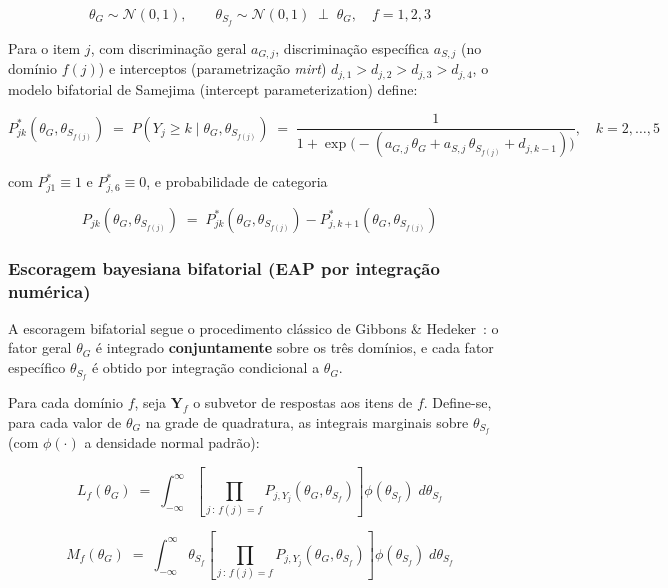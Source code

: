 \documentclass[12pt,a4paper]{article}
\begin{document}
\begin{equation}
\theta_G \sim \mathcal{N}(0,1), \qquad
\theta_{S_f} \sim \mathcal{N}(0,1) \; \perp \; \theta_G, \quad f=1,2,3
\label{eq:iqol-prior}
\end{equation}

Para o item $j$, com discriminação geral $a_{G,j}$, discriminação específica
$a_{S,j}$ (no domínio $f(j)$) e interceptos (parametrização \emph{mirt})
$d_{j,1} > d_{j,2} > d_{j,3} > d_{j,4}$, o modelo bifatorial de Samejima
(intercept parameterization) define:

\begin{equation}
P^*_{jk}(\theta_G, \theta_{S_{f(j)}}) \;=\; P(Y_j \geq k \mid \theta_G,\theta_{S_{f(j)}})
\;=\; \frac{1}{1 + \exp\!\big(-(a_{G,j}\,\theta_G + a_{S,j}\,\theta_{S_{f(j)}} + d_{j,k-1})\big)},
\quad k=2,\dots,5
\label{eq:iqol-cumulative}
\end{equation}

com $P^*_{j1} \equiv 1$ e $P^*_{j,6} \equiv 0$, e probabilidade de categoria

\begin{equation}
P_{jk}(\theta_G, \theta_{S_{f(j)}}) \;=\; P^*_{jk}(\theta_G, \theta_{S_{f(j)}}) - P^*_{j,k+1}(\theta_G, \theta_{S_{f(j)}})
\label{eq:iqol-category}
\end{equation}

\subsubsection{Escoragem bayesiana bifatorial (EAP por integração numérica)}

A escoragem bifatorial segue o procedimento clássico de
Gibbons \& Hedeker~\cite{gibbonshedeker1992}: o fator geral $\theta_G$ é
integrado \textbf{conjuntamente} sobre os três domínios, e cada fator
específico $\theta_{S_f}$ é obtido por integração condicional a $\theta_G$.

Para cada domínio $f$, seja $\mathbf{Y}_f$ o subvetor de respostas aos itens
de $f$. Define-se, para cada valor de $\theta_G$ na grade de quadratura, as
integrais marginais sobre $\theta_{S_f}$ (com $\phi(\cdot)$ a densidade
normal padrão):

\begin{equation}
L_f(\theta_G) \;=\; \int_{-\infty}^{\infty}
\left[\prod_{j \,:\, f(j)=f} P_{j,Y_j}(\theta_G,\theta_{S_f})\right]
\phi(\theta_{S_f}) \; d\theta_{S_f}
\label{eq:iqol-Lf}
\end{equation}

\begin{equation}
M_f(\theta_G) \;=\; \int_{-\infty}^{\infty} \theta_{S_f}
\left[\prod_{j \,:\, f(j)=f} P_{j,Y_j}(\theta_G,\theta_{S_f})\right]
\phi(\theta_{S_f}) \; d\theta_{S_f}
\label{eq:iqol-Mf}
\end{equation}
\end{document}
